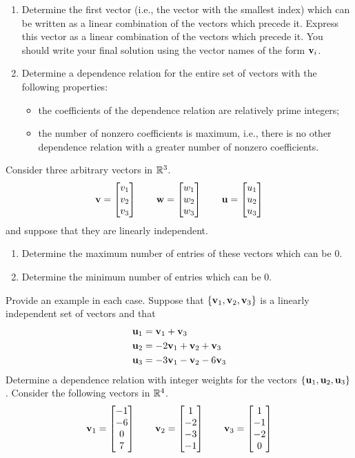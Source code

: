 \begin{tasks}[resume, style=enumerate]
  \begin{enumerate}[label=(\alph*)]
  \item
    Determine the first vector (i.e., the vector with the smallest
    index) which can be written as a linear combination of the
    vectors which precede it.  Express this vector as a linear
    combination of the vectors which precede it.  You should write
    your final solution using the vector names of the form $\mathbf v_i$.
  \item
    Determine a dependence relation for the entire set of vectors with
    the following properties:
    \begin{itemize}
    \item
      the coefficients of the dependence relation are relatively prime
      integers;
    \item
      the number of nonzero coefficients is maximum, i.e., there is no
      other dependence relation with a greater number of nonzero
      coefficients.
    \end{itemize}
  \end{enumerate}
\task
  Consider three arbitrary vectors in $\mathbb R^3$.
  \begin{displaymath}
    \mathbf v =  \begin{bmatrix} v_1 \\ v_2 \\ v_3 \end{bmatrix} 
    \qquad
    \mathbf w =  \begin{bmatrix} w_1 \\ w_2 \\ w_3 \end{bmatrix} 
    \qquad
    \mathbf u =  \begin{bmatrix} u_1 \\ u_2 \\ u_3 \end{bmatrix} 
  \end{displaymath}
  and suppose that they are linearly independent.
  \begin{enumerate}[label=(\alph*)]
  \item Determine the maximum number of entries of these vectors which
    can be $0$.
  \item Determine the minimum number of entries which can be $0$.
  \end{enumerate}
  Provide an example in each case.
\task
  Suppose that $\{\mathbf v_1, \mathbf v_2, \mathbf v_3\}$ is a linearly independent set
  of vectors and that
  \begin{align*}
    \mathbf u_1 &= \mathbf v_1 + \mathbf v_3 \\
    \mathbf u_2 &= -2 \mathbf v_1 + \mathbf v_2 + \mathbf v_3 \\
    \mathbf u_3 &= -3 \mathbf v_1 - \mathbf v_2 - 6 \mathbf v_3
  \end{align*}
  Determine a dependence relation with integer weights for the vectors
  $\{\mathbf u_1, \mathbf u_2, \mathbf u_3\}$.
\task
  Consider the following vectors in $\mathbb R^4$.
  \begin{displaymath}
    \vv_1 = \vFour {-1} {-6} 0 7
    \qquad
    \vv_2 = \vFour 1 {-2} {-3} {-1}
    \qquad
    \vv_3 = \vFour 1 {-1} {-2} 0

\end{displaymath}
\end{tasks}
